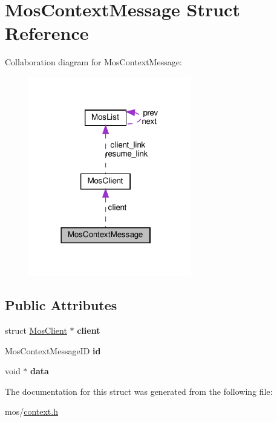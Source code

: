 \hypertarget{structMosContextMessage}{}\section{Mos\+Context\+Message Struct Reference}
\label{structMosContextMessage}


Collaboration diagram for Mos\+Context\+Message\+:\nopagebreak
\begin{figure}[H]
\begin{center}
\leavevmode
\includegraphics[width=201pt]{structMosContextMessage__coll__graph}
\end{center}
\end{figure}
\subsection*{Public Attributes}
\begin{DoxyCompactItemize}
\item 
\mbox{\label{structMosContextMessage_a453c6a2a36b77d43426ee02407283ac0}} 
struct \hyperlink{structMosClient}{Mos\+Client} $\ast$ {\bfseries client}
\item 
\mbox{\label{structMosContextMessage_ae762d897f62444833dfc88cbae2345c1}} 
Mos\+Context\+Message\+ID {\bfseries id}
\item 
\mbox{\label{structMosContextMessage_abea2109a6afbf96cd8df72f6e9445a4a}} 
void $\ast$ {\bfseries data}
\end{DoxyCompactItemize}


The documentation for this struct was generated from the following file\+:\begin{DoxyCompactItemize}
\item 
mos/\hyperlink{context_8h}{context.\+h}\end{DoxyCompactItemize}
